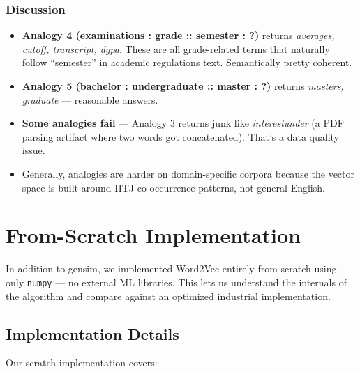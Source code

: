 \documentclass[11pt,a4paper]{article}
\begin{document}
\subsubsection*{Discussion}

\begin{itemize}[leftmargin=1.5em]
  \item \textbf{Analogy 4 (examinations : grade :: semester : ?)} returns \textit{averages, cutoff, transcript, dgpa}. These are all grade-related terms that naturally follow ``semester'' in academic regulations text. Semantically pretty coherent.
  \item \textbf{Analogy 5 (bachelor : undergraduate :: master : ?)} returns \textit{masters, graduate} --- reasonable answers.
  \item \textbf{Some analogies fail} --- Analogy 3 returns junk like \textit{interestunder} (a PDF parsing artifact where two words got concatenated). That's a data quality issue.
  \item Generally, analogies are harder on domain-specific corpora because the vector space is built around IITJ co-occurrence patterns, not general English.
\end{itemize}

\section{From-Scratch Implementation}

In addition to gensim, we implemented Word2Vec entirely from scratch using only \texttt{numpy} --- no external ML libraries. This lets us understand the internals of the algorithm and compare against an optimized industrial implementation.

\subsection{Implementation Details}

Our scratch implementation covers:
\end{document}
